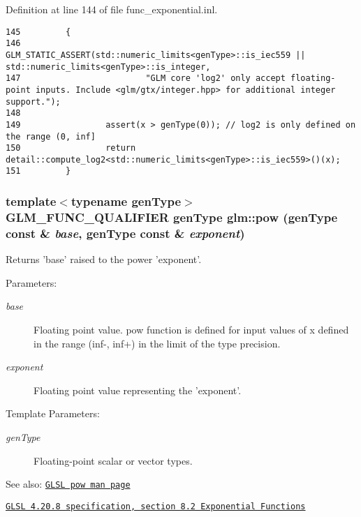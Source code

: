Definition at line 144 of file func\_\-exponential.inl.

\begin{Code}\begin{verbatim}145         {
146                 GLM_STATIC_ASSERT(std::numeric_limits<genType>::is_iec559 || std::numeric_limits<genType>::is_integer,
147                         "GLM core 'log2' only accept floating-point inputs. Include <glm/gtx/integer.hpp> for additional integer support.");
148 
149                 assert(x > genType(0)); // log2 is only defined on the range (0, inf]
150                 return detail::compute_log2<std::numeric_limits<genType>::is_iec559>()(x);
151         }
\end{verbatim}
\end{Code}


\hypertarget{group__core__func__exponential_gfdaffc3606f4ee7f415cd64ada108356}{
\subsubsection[pow]{\setlength{\rightskip}{0pt plus 5cm}template$<$typename genType$>$ GLM\_\-FUNC\_\-QUALIFIER genType glm::pow (genType const \& {\em base}, \/  genType const \& {\em exponent})}}
\label{group__core__func__exponential_gfdaffc3606f4ee7f415cd64ada108356}


Returns 'base' raised to the power 'exponent'.

\begin{Desc}
\item[Parameters:]
\begin{description}
\item[{\em base}]Floating point value. pow function is defined for input values of x defined in the range (inf-, inf+) in the limit of the type precision. \item[{\em exponent}]Floating point value representing the 'exponent'. \end{description}
\end{Desc}
\begin{Desc}
\item[Template Parameters:]
\begin{description}
\item[{\em genType}]Floating-point scalar or vector types.\end{description}
\end{Desc}
\begin{Desc}
\item[See also:]\href{http://www.opengl.org/sdk/docs/manglsl/xhtml/pow.xml}{\tt GLSL pow man page} 

\href{http://www.opengl.org/registry/doc/GLSLangSpec.4.20.8.pdf}{\tt GLSL 4.20.8 specification, section 8.2 Exponential Functions} \end{Desc}



